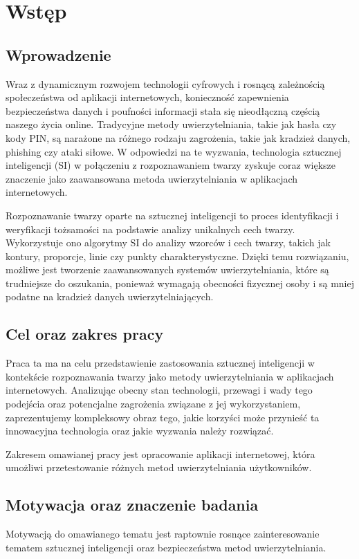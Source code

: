 \chapter{Wstęp}
\section{Wprowadzenie}
Wraz z dynamicznym rozwojem technologii cyfrowych i rosnącą zależnością społeczeństwa od aplikacji internetowych, konieczność zapewnienia bezpieczeństwa danych i poufności informacji stała się nieodłączną częścią naszego życia online. Tradycyjne metody uwierzytelniania, takie jak hasła czy kody PIN, są narażone na różnego rodzaju zagrożenia, takie jak kradzież danych, phishing czy ataki siłowe. W odpowiedzi na te wyzwania, technologia sztucznej inteligencji (SI) w połączeniu z rozpoznawaniem twarzy zyskuje coraz większe znaczenie jako zaawansowana metoda uwierzytelniania w aplikacjach internetowych.

Rozpoznawanie twarzy oparte na sztucznej inteligencji to proces identyfikacji i weryfikacji tożsamości na podstawie analizy unikalnych cech twarzy. Wykorzystuje ono algorytmy SI do analizy wzorców i cech twarzy, takich jak kontury, proporcje, linie czy punkty charakterystyczne. Dzięki temu rozwiązaniu, możliwe jest tworzenie zaawansowanych systemów uwierzytelniania, które są trudniejsze do oszukania, ponieważ wymagają obecności fizycznej osoby i są mniej podatne na kradzież danych uwierzytelniających.
\section{Cel oraz zakres pracy}
Praca ta ma na celu przedstawienie zastosowania sztucznej inteligencji w kontekście rozpoznawania twarzy jako metody uwierzytelniania w aplikacjach internetowych. Analizując obecny stan technologii, przewagi i wady tego podejścia oraz potencjalne zagrożenia związane z jej wykorzystaniem, zaprezentujemy kompleksowy obraz tego, jakie korzyści może przynieść ta innowacyjna technologia oraz jakie wyzwania należy rozwiązać.

Zakresem omawianej pracy jest opracowanie aplikacji internetowej, która umożliwi przetestowanie różnych metod uwierzytelniania użytkowników.
\section{Motywacja oraz znaczenie badania}
Motywacją do omawianego tematu jest raptownie rosnące zainteresowanie tematem sztucznej inteligencji oraz bezpieczeństwa metod uwierzytelniania.

